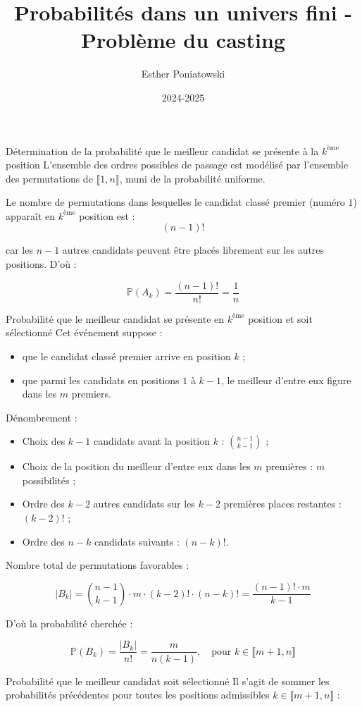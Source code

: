 \documentclass[10pt,a4paper]{article}
\title{Probabilités dans un univers fini - Problème du casting}
\author{Esther Poniatowski}
\date{2024-2025}
\begin{document}
\q Détermination de la probabilité que le meilleur candidat se présente à la \( k^\text{ème} \)
position
L'ensemble des ordres possibles de passage est modélisé par l'ensemble des permutations de \(
\llbracket 1, n \rrbracket \), muni de la probabilité uniforme.

Le nombre de permutations dans lesquelles le candidat classé premier (numéro \( 1 \)) apparaît en \(
k^\text{ème} \) position est :
\[
(n-1)!
\]

car les \( n-1 \) autres candidats peuvent être placés librement sur les autres positions. D'où :

\[
\mathbb{P}(A_k) = \frac{(n-1)!}{n!} = \boxed{\dfrac{1}{n}}
\]


\q Probabilité que le meilleur candidat se présente en \( k^\text{ème} \) position et soit
sélectionné
Cet événement suppose :
\begin{itemize}
 \item que le candidat classé premier arrive en position \( k \) ;
 \item que parmi les candidats en positions \( 1 \) à \( k-1 \), le meilleur d'entre eux figure dans
 les \( m \) premiers.
\end{itemize}

Dénombrement :
\begin{itemize}
 \item Choix des \( k-1 \) candidats avant la position \( k \) : \( \binom{n-1}{k-1} \) ;
 \item Choix de la position du meilleur d'entre eux dans les \( m \) premières : \( m \)
 possibilités ;
 \item Ordre des \( k-2 \) autres candidats sur les \( k-2 \) premières places restantes : \( (k-2)!
 \) ;
 \item Ordre des \( n - k \) candidats suivants : \( (n - k)! \).
\end{itemize}

Nombre total de permutations favorables :

\[
|B_k| = \binom{n-1}{k-1} \cdot m \cdot (k-2)! \cdot (n-k)! = \dfrac{(n-1)! \cdot m}{k - 1}
\]

D'où la probabilité cherchée :

\[
\mathbb{P}(B_k) = \dfrac{|B_k|}{n!} = \boxed{\dfrac{m}{n(k-1)}}, \quad \text{pour } k \in \llbracket m+1, n \rrbracket
\]


\q Probabilité que le meilleur candidat soit sélectionné
Il s'agit de sommer les probabilités précédentes pour toutes les positions admissibles \( k \in
\llbracket m+1, n \rrbracket \) :
\end{document}
